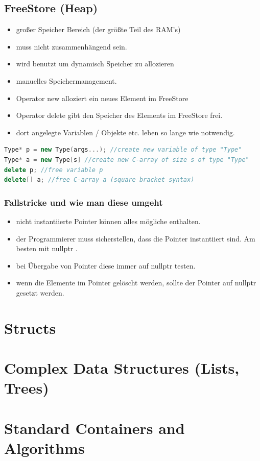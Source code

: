 \subsection{FreeStore (Heap)}
\begin{itemize}
	\item großer Speicher Bereich (der größte Teil des RAM's)
	\item muss nicht zusammenhängend sein. 
	\item wird benutzt um dynamisch Speicher zu allozieren
	\item manuelles Speichermanagement.
	\item Operator new alloziert ein neues Element im FreeStore 
	\item Operator delete gibt den Speicher des Elements im FreeStore frei.
	\item dort angelegte Variablen / Objekte etc. leben so lange wie notwendig.
\end{itemize}
\begin{lstlisting}[language=C++]
Type* p = new Type(args...); //create new variable of type "Type"
Type* a = new Type[s] //create new C-array of size s of type "Type"
delete p; //free variable p
delete[] a; //free C-array a (square bracket syntax)
\end{lstlisting}
\subsubsection{Fallstricke und wie man diese umgeht}
\begin{itemize}
	\item nicht instantiierte Pointer können alles mögliche enthalten.
	\item der Programmierer muss sicherstellen, dass die Pointer instantiiert sind. Am besten mit nullptr .
	\item bei Übergabe von Pointer diese immer auf nullptr testen.
	\item wenn die Elemente im Pointer gelöscht werden, sollte der Pointer auf nullptr gesetzt werden.
\end{itemize}
\section{Structs}
\section{Complex Data Structures (Lists, Trees)}
\section{Standard Containers and Algorithms}	

